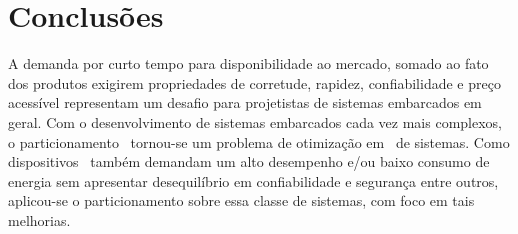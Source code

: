 \chapter{Conclusões} \label{chap:conclu}
    A demanda por curto tempo para disponibilidade ao mercado, somado ao fato dos produtos exigirem propriedades de corretude, rapidez, confiabilidade e preço acessível representam um desafio para projetistas de sistemas embarcados em geral.
    Com o desenvolvimento de sistemas embarcados cada vez mais complexos, o particionamento \hs\ tornou-se um problema de otimização em \codesign\ de sistemas.
    Como dispositivos \wearables\ também demandam um alto desempenho e/ou baixo consumo de energia sem apresentar desequilíbrio em confiabilidade e segurança entre outros, aplicou-se o particionamento sobre essa classe de sistemas, com foco em tais melhorias.
    
